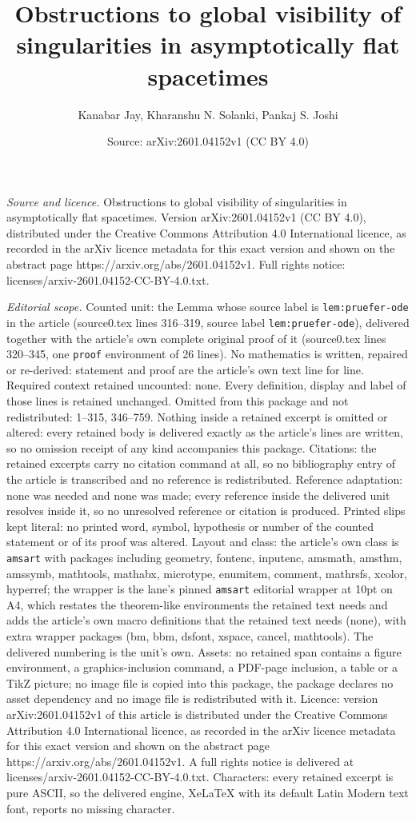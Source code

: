 \documentclass[10pt,a4paper]{amsart}
\title[Obstructions to global visibility of singularities in asympt]{Obstructions to global visibility of singularities in asymptotically flat spacetimes}
\author{Kanabar Jay, Kharanshu N. Solanki, Pankaj S. Joshi}
\date{Source: arXiv:2601.04152v1 (CC BY 4.0)}
\begin{document}
\maketitle

\noindent\emph{Source and licence.} Obstructions to global visibility of singularities in asymptotically flat spacetimes. Version arXiv:2601.04152v1 (CC BY 4.0), distributed under the Creative Commons Attribution 4.0 International licence, as recorded in the arXiv licence metadata for this exact version and shown on the abstract page https://arxiv.org/abs/2601.04152v1. Full rights notice: licenses/arxiv-2601.04152-CC-BY-4.0.txt.\par\smallskip

\noindent\textit{Editorial scope.} Counted unit: the Lemma whose source label is \texttt{lem:pruefer-ode} in the article (source0.tex lines 316--319, source label \texttt{lem:pruefer-ode}), delivered together with the article's own complete original proof of it (source0.tex lines 320--345, one \texttt{proof} environment of 26 lines). No mathematics is written, repaired or re-derived: statement and proof are the article's own text line for line. Required context retained uncounted: none. Every definition, display and label of those lines is retained unchanged. Omitted from this package and not redistributed: 1--315, 346--759. Nothing inside a retained excerpt is omitted or altered: every retained body is delivered exactly as the article's lines are written, so no omission receipt of any kind accompanies this package. Citations: the retained excerpts carry no citation command at all, so no bibliography entry of the article is transcribed and no reference is redistributed. Reference adaptation: none was needed and none was made; every reference inside the delivered unit resolves inside it, so no unresolved reference or citation is produced. Printed slips kept literal: no printed word, symbol, hypothesis or number of the counted statement or of its proof was altered. Layout and class: the article's own class is \texttt{amsart} with packages including geometry, fontenc, inputenc, amsmath, amsthm, amssymb, mathtools, mathabx, microtype, enumitem, comment, mathrsfs, xcolor, hyperref; the wrapper is the lane's pinned \texttt{amsart} editorial wrapper at 10pt on A4, which restates the theorem-like environments the retained text needs and adds the article's own macro definitions that the retained text needs (none), with extra wrapper packages (bm, bbm, dsfont, xspace, cancel, mathtools). The delivered numbering is the unit's own. Assets: no retained span contains a figure environment, a graphics-inclusion command, a PDF-page inclusion, a table or a TikZ picture; no image file is copied into this package, the package declares no asset dependency and no image file is redistributed with it. Licence: version arXiv:2601.04152v1 of this article is distributed under the Creative Commons Attribution 4.0 International licence, as recorded in the arXiv licence metadata for this exact version and shown on the abstract page https://arxiv.org/abs/2601.04152v1. A full rights notice is delivered at licenses/arxiv-2601.04152-CC-BY-4.0.txt. Characters: every retained excerpt is pure ASCII, so the delivered engine, XeLaTeX with its default Latin Modern text font, reports no missing character.
\end{document}
